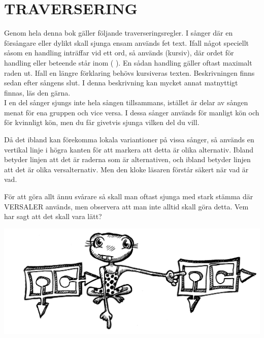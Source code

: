 \documentclass[a6paper,fontsize=10pt,twoside,open=right]{scrbook}
\begin{document}
\section{TRAVERSERING}\vspace{10pt}
\hspace{10pt}Genom hela denna bok gäller följande
traverseringsregler. I sånger där en försångare eller dylikt skall
sjunga ensam används fet text. Ifall något speciellt såsom en handling
inträffar vid ett ord, så används (kursiv), där ordet för handling
eller beteende står inom ( ). En sådan handling gäller oftast maximalt
raden ut. Ifall en längre förklaring behövs kursiveras
texten. Beskrivningen finns sedan efter sångens slut. I denna
beskrivning kan mycket annat matnyttigt finnas, läs den
gärna.\\ \indent I en del sånger sjungs inte hela sången tillsammans,
istället är delar av sången menat för ena gruppen och vice versa. I
dessa sånger används {\Large\Male} för manligt kön och {\Large\Female}
för kvinnligt kön, men du får givetvis sjunga vilken del du vill.
\begin{leftborder}
  \hspace{10pt}Då det ibland kan förekomma lokala variantioner på vissa sånger, så
  används en  vertikal linje i högra kanten för att markera att detta
  är olika alternativ. Ibland betyder linjen att det är raderna som är
  alternativen, och ibland betyder linjen att det är olika
  versalternativ. Men den kloke läsaren förstår säkert när vad är vad.
\end{leftborder}
\hspace{15pt} För att göra allt ännu svårare så skall man oftast sjunga med stark
stämma där VERSALER används, men observera att man inte alltid skall
göra detta. Vem har sagt att det skall vara lätt?
\newpage
\cleardoublepage
\renewcommand{\contentsname}{\vspace{-2.17cm}\rmfamily{\fontsize{13}{15}\textbf{INNEHÅLL}}\vspace{-1.2cm}}
\tableofcontents\par
\vfill
\noindent\includegraphics[keepaspectratio,width=\textwidth]{elements/groda.jpg}
\vfill
\renewcommand{\leftmark}{}
\end{document}
